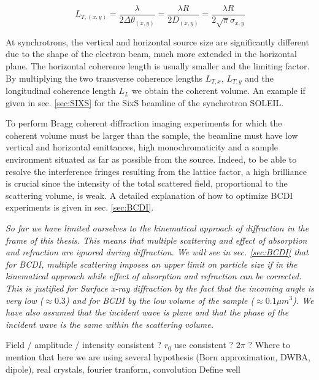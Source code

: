 \begin{equation}
    \label{eq:TransverseCoL}
    L_{T,(x,y)} = \frac{\lambda}{2\Delta\theta_{(x,y)}} = \frac{\lambda R}{2 D_{(x,y)}} = \frac{\lambda R}{2\sqrt{\pi}\sigma_{x,y}}
\end{equation}

At synchrotrons, the vertical and horizontal source size are significantly different due to the shape of the electron beam, much more extended in the horizontal plane.
The horizontal coherence length is usually smaller and the limiting factor.
By multiplying the two transverse coherence lengths $L_{T,x}$, $L_{T,y}$ and the longitudinal coherence length $L_L$ we obtain the coherent volume.
An example if given in sec. \ref{sec:SIXS} for the SixS beamline of the synchrotron SOLEIL.

To perform Bragg coherent diffraction imaging experiments for which the coherent volume must be larger than the sample, the beamline must have low vertical and horizontal emittances, high monochromaticity and a sample environment situated as far as possible from the source.
Indeed, to be able to resolve the interference fringes resulting from the lattice factor, a high brilliance is crucial since the intensity of the total scattered field, proportional to the scattering volume, is weak.
A detailed explanation of how to optimize BCDI experiments is given in sec. \ref{sec:BCDI}.

\textit{
So far we have limited ourselves to the kinematical approach of diffraction in the frame of this thesis.
This means that multiple scattering and effect of absorption and refraction are ignored during diffraction.
We will see in sec. \ref{sec:BCDI} that for BCDI, multiple scattering imposes an upper limit on particle size if in the kinematical approach while effect of absorption and refraction can be corrected.
This is justified for Surface x-ray diffraction by the fact that the incoming angle is very low ($\approx 0.3$) and for BCDI by the low volume of the sample ($\approx 0.1 \mu m^3$).
We have also assumed that the incident wave is plane and that the phase of the incident wave is the same within the scattering volume.
}

\textcolor{Important}{Field / amplitude / intensity consistent ? $r_0$ use consistent ? $2\pi$ ? Where to mention that here we are using several hypothesis (Born approximation, DWBA, dipole), real crystals, fourier tranform, convolution
Define well}
